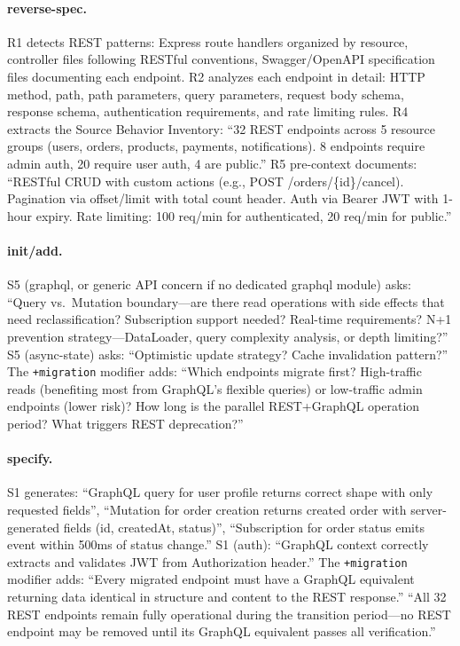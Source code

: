 \documentclass[11pt,a4paper,openright,twoside]{report}
\begin{document}
\paragraph{reverse-spec.}
R1 detects REST patterns: Express route handlers organized by resource, controller files following RESTful conventions, Swagger/OpenAPI specification files documenting each endpoint. R2 analyzes each endpoint in detail: HTTP method, path, path parameters, query parameters, request body schema, response schema, authentication requirements, and rate limiting rules. R4 extracts the Source Behavior Inventory: ``32 REST endpoints across 5 resource groups (users, orders, products, payments, notifications). 8 endpoints require admin auth, 20 require user auth, 4 are public.'' R5 pre-context documents: ``RESTful CRUD with custom actions (e.g., POST /orders/\{id\}/cancel). Pagination via offset/limit with total count header. Auth via Bearer JWT with 1-hour expiry. Rate limiting: 100 req/min for authenticated, 20 req/min for public.''

\paragraph{init/add.}
S5 (graphql, or generic API concern if no dedicated graphql module) asks: ``Query vs.\ Mutation boundary---are there read operations with side effects that need reclassification? Subscription support needed? Real-time requirements? N+1 prevention strategy---DataLoader, query complexity analysis, or depth limiting?'' S5 (async-state) asks: ``Optimistic update strategy? Cache invalidation pattern?'' The \texttt{+migration} modifier adds: ``Which endpoints migrate first? High-traffic reads (benefiting most from GraphQL's flexible queries) or low-traffic admin endpoints (lower risk)? How long is the parallel REST+GraphQL operation period? What triggers REST deprecation?''

\paragraph{specify.}
S1 generates: ``GraphQL query for user profile returns correct shape with only requested fields'', ``Mutation for order creation returns created order with server-generated fields (id, createdAt, status)'', ``Subscription for order status emits event within 500ms of status change.'' S1 (auth): ``GraphQL context correctly extracts and validates JWT from Authorization header.'' The \texttt{+migration} modifier adds: ``Every migrated endpoint must have a GraphQL equivalent returning data identical in structure and content to the REST response.'' ``All 32 REST endpoints remain fully operational during the transition period---no REST endpoint may be removed until its GraphQL equivalent passes all verification.''
\end{document}
